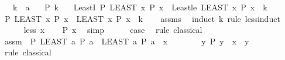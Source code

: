 \begin{isabellebody}
\ \ \ k\ {\isacharcolon}{\kern0pt}{\isacharcolon}{\kern0pt}\ {\isacharprime}{\kern0pt}a\isanewline
\ \ \ {\isachardoublequoteopen}P\ k{\isachardoublequoteclose}\isanewline
\ \ \ LeastI{\isacharcolon}{\kern0pt}\ {\isachardoublequoteopen}P\ {\isacharparenleft}{\kern0pt}LEAST\ x{\isachardot}{\kern0pt}\ P\ x{\isacharparenright}{\kern0pt}{\isachardoublequoteclose}\ \ Least{\isacharunderscore}{\kern0pt}le{\isacharcolon}{\kern0pt}\ {\isachardoublequoteopen}{\isacharparenleft}{\kern0pt}LEAST\ x{\isachardot}{\kern0pt}\ P\ x{\isacharparenright}{\kern0pt}\ {\isasymle}\ k{\isachardoublequoteclose}\isanewline
%
\isadelimproof
%
\endisadelimproof
%
\isatagproof
{}\isamarkupfalse%
\ {\isacharminus}{\kern0pt}\isanewline
\ \ \isamarkupfalse%
\ {\isachardoublequoteopen}P\ {\isacharparenleft}{\kern0pt}LEAST\ x{\isachardot}{\kern0pt}\ P\ x{\isacharparenright}{\kern0pt}\ {\isasymand}\ {\isacharparenleft}{\kern0pt}LEAST\ x{\isachardot}{\kern0pt}\ P\ x{\isacharparenright}{\kern0pt}\ {\isasymle}\ k{\isachardoublequoteclose}\isanewline
\ \ \isamarkupfalse%
\ assms\ \isamarkupfalse%
\ {\isacharparenleft}{\kern0pt}induct\ k\ rule{\isacharcolon}{\kern0pt}\ less{\isacharunderscore}{\kern0pt}induct{\isacharparenright}{\kern0pt}\isanewline
\ \ \ \ \isamarkupfalse%
\ {\isacharparenleft}{\kern0pt}less\ x{\isacharparenright}{\kern0pt}\ \isamarkupfalse%
\ \isamarkupfalse%
\ {\isachardoublequoteopen}P\ x{\isachardoublequoteclose}\ \isamarkupfalse%
\ simp\isanewline
\ \ \ \ \isamarkupfalse%
\ {\isacharquery}{\kern0pt}case\ \isamarkupfalse%
\ {\isacharparenleft}{\kern0pt}rule\ classical{\isacharparenright}{\kern0pt}\isanewline
\ \ \ \ \ \ \isamarkupfalse%
\ assm{\isacharcolon}{\kern0pt}\ {\isachardoublequoteopen}{\isasymnot}\ {\isacharparenleft}{\kern0pt}P\ {\isacharparenleft}{\kern0pt}LEAST\ a{\isachardot}{\kern0pt}\ P\ a{\isacharparenright}{\kern0pt}\ {\isasymand}\ {\isacharparenleft}{\kern0pt}LEAST\ a{\isachardot}{\kern0pt}\ P\ a{\isacharparenright}{\kern0pt}\ {\isasymle}\ x{\isacharparenright}{\kern0pt}{\isachardoublequoteclose}\isanewline
\ \ \ \ \ \ \isamarkupfalse%
\ {\isachardoublequoteopen}{\isasymAnd}y{\isachardot}{\kern0pt}\ P\ y\ {\isasymLongrightarrow}\ x\ {\isasymle}\ y{\isachardoublequoteclose}\isanewline
\ \ \ \ \ \ \isamarkupfalse%
\ {\isacharparenleft}{\kern0pt}rule\ classical{\isacharparenright}{\kern0pt}\isanewline

\end{isabellebody}
